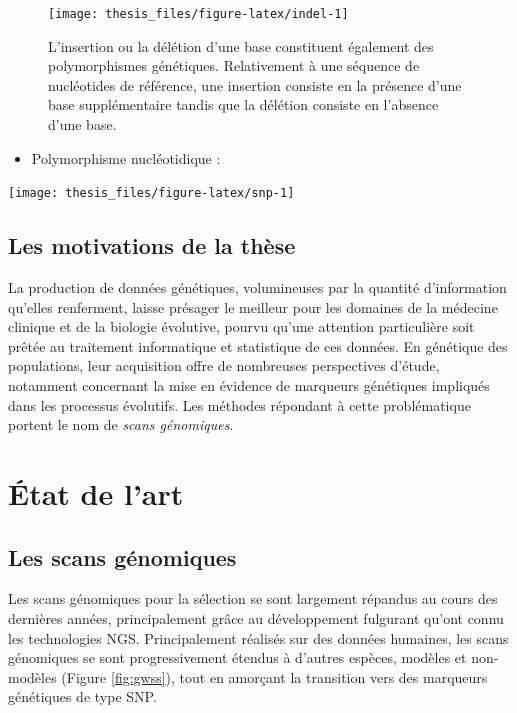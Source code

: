 \documentclass[12pt,a4paper,twoside]{ugathesis}
\providecommand{\tightlist}{%
  \setlength{\itemsep}{0pt}\setlength{\parskip}{0pt}}
\theoremstyle{definition}
\theoremstyle{definition}
\theoremstyle{remark}
\begin{document}
\begin{figure}

{\centering \texttt{[image: thesis\_files/figure-latex/indel-1]} 

}

\caption{L'insertion ou la délétion d'une base constituent
également des polymorphismes génétiques. Relativement à une séquence de
nucléotides de référence, une insertion consiste en la présence d'une
base supplémentaire tandis que la délétion consiste en l'absence d'une
base.}\label{fig:indel}
\end{figure}
\begin{itemize}
\tightlist
\item
  Polymorphisme nucléotidique :
\end{itemize}
\begin{center}\texttt{[image: thesis\_files/figure-latex/snp-1]} \end{center}

\section{Les motivations de la thèse}\label{les-motivations-de-la-these}

La production de données génétiques, volumineuses par la quantité
d'information qu'elles renferment, laisse présager le meilleur pour les
domaines de la médecine clinique et de la biologie évolutive, pourvu
qu'une attention particulière soit prêtée au traitement informatique et
statistique de ces données. En génétique des populations, leur
acquisition offre de nombreuses perspectives d'étude, notamment
concernant la mise en évidence de marqueurs génétiques impliqués dans
les processus évolutifs. Les méthodes répondant à cette problématique
portent le nom de \emph{scans génomiques}.

\chapter{État de l'art}\label{etat-de-lart}

\section{Les scans génomiques}\label{les-scans-genomiques}

Les scans génomiques pour la sélection se sont largement répandus au
cours des dernières années, principalement grâce au développement
fulgurant qu'ont connu les technologies NGS. Principalement réalisés sur
des données humaines, les scans génomiques se sont progressivement
étendus à d'autres espèces, modèles et non-modèles (Figure
\ref{fig:gwss}), tout en amorçant la transition vers des marqueurs
génétiques de type SNP.
\end{document}
